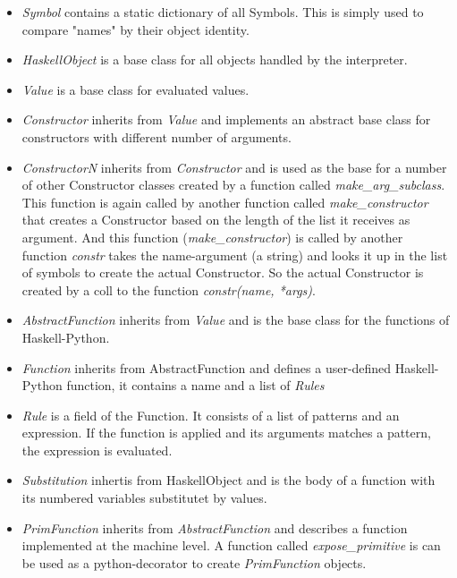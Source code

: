 \begin{itemize}

\item \emph{Symbol} contains a static dictionary of all Symbols. This is 
simply used to compare "names" by their object identity.

\item \emph{HaskellObject} is a base class for all objects handled by the
interpreter.

\item \emph{Value} is a base class for evaluated values.

\item \emph{Constructor} inherits from \emph{Value} and implements an abstract 
base class for constructors with different number of arguments.

\item \emph{ConstructorN} inherits from \emph{Constructor} and is used as the 
base for a number of other Constructor classes created by a function called 
\emph{make\_arg\_subclass}. This function is again called by another function
called \emph{make\_constructor} that creates a Constructor based on the length
of the list it receives as argument. And this function (\emph{make\_constructor})
is called by another function \emph{constr} takes the name-argument (a string)
and looks it up in the list of symbols to create the actual Constructor. So the
actual Constructor is created by a coll to the function \emph{constr(name, *args)}.

\item \emph{AbstractFunction} inherits from \emph{Value} and is the base class for 
the functions of Haskell-Python. 

\item \emph{Function} inherits from AbstractFunction and defines a user-defined 
Haskell-Python function, it contains a name and a list of \emph{Rules}

\item \emph{Rule} is a field of the Function. It consists of a list of patterns and
an expression. If the function is applied and its arguments matches a pattern, the
expression is evaluated.

\item \emph{Substitution} inhertis from HaskellObject and is the body of a function 
with its numbered variables substitutet by values.

\item \emph{PrimFunction} inherits from \emph{AbstractFunction} and describes a function
implemented at the machine level. A function called \emph{expose\_primitive} is
can be used as a python-decorator to create \emph{PrimFunction} objects.


\end{itemize}
